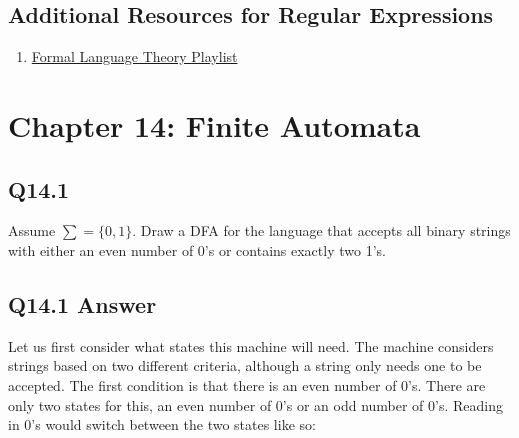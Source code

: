 \documentclass{article}
\begin{document}
\subsection*{Additional Resources for Regular Expressions}
\begin{enumerate}
    \item \href{https://www.youtube.com/playlist?list=PLBlnK6fEyqRgp46KUv4ZY69yXmpwKOIev}{Formal Language Theory Playlist}
\end{enumerate}
\newpage
{} \section*{Chapter 14: Finite Automata}
 \subsection*{Q14.1}
Assume $\sum=\{0,1\}$. Draw a DFA for the language that accepts all binary strings with either an even number of 0's or contains exactly two 1's.
\newpage
{} \subsection*{Q14.1 Answer}
Let us first consider what states this machine will need. The machine considers strings based on two different criteria, although a string only needs one to be accepted. The first condition is that there is an even number of 0's. There are only two states for this, an even number of 0's or an odd number of 0's. Reading in 0's would switch between the two states like so:
\begin{center}
\end{center}
\end{document}
